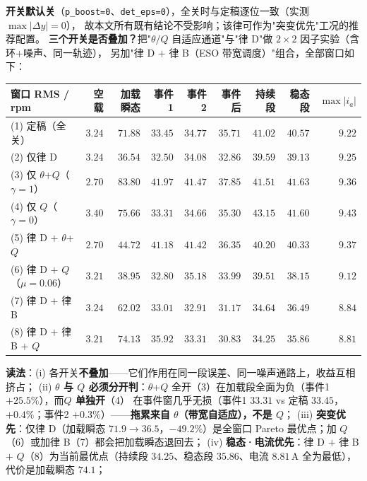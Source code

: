 \documentclass[11pt]{article}
\theoremstyle{remark}\newtheorem{remark}{注}
\begin{document}
\textbf{开关默认关}（\texttt{p\_boost=0}、\texttt{det\_eps=0}），全关时与定稿逐位一致（实测 $\max|\Delta y|=0$），
故本文所有既有结论不受影响；该律可作为"突变优先"工况的推荐配置。
\vspace{1mm}
\noindent\textbf{三个开关是否叠加？}把"$\theta/Q$ 自适应通道"与"律 D"做 $2\times2$ 因子实验（含环$+$噪声、同一轨迹），
另加"律 D $+$ 律 B（ESO 带宽调度）"组合，全部窗口如下：
\begin{center}
\footnotesize
\begin{tabular}{@{}lrrrrrrrr@{}}
\toprule
窗口 RMS / rpm & 空载 & 加载瞬态 & 事件1 & 事件2 & 事件后 & 持续段 & 稳态段 & $\max|i_a|$\\
\midrule
(1) 定稿（全关） & $3.24$ & $71.88$ & $33.45$ & $34.77$ & $35.71$ & $41.02$ & $40.57$ & $9.22$\\
(2) 仅律 D & $3.24$ & $\mathbf{36.54}$ & $32.50$ & $34.08$ & $32.86$ & $39.59$ & $39.13$ & $9.25$\\
(3) 仅 $\theta$+$Q$（$\gamma=1$） & $2.70$ & $83.80$ & $41.97$ & $41.47$ & $37.85$ & $41.51$ & $41.63$ & $9.36$\\
(4) 仅 $Q$（$\gamma=0$） & $3.40$ & $75.66$ & $33.31$ & $34.66$ & $35.30$ & $43.15$ & $41.60$ & $9.43$\\
(5) 律 D $+$ $\theta$+$Q$ & $2.70$ & $44.72$ & $41.18$ & $41.42$ & $36.35$ & $40.20$ & $40.33$ & $9.37$\\
(6) 律 D $+$ $Q$（$\mu{=}0.06$） & $3.21$ & $38.95$ & $32.80$ & $35.18$ & $33.99$ & $39.51$ & $\mathbf{38.15}$ & $9.12$\\
(7) 律 D $+$ 律 B & $3.24$ & $62.02$ & $33.01$ & $32.91$ & $31.17$ & $34.64$ & $36.49$ & $8.84$\\
(8) 律 D $+$ 律 B $+$ $Q$ & $3.21$ & $74.13$ & $35.92$ & $33.31$ & $\mathbf{30.83}$ & $\mathbf{34.25}$ & $\mathbf{35.86}$ & $\mathbf{8.81}$\\
\bottomrule
\end{tabular}
\end{center}
\noindent\textbf{读法}：(i) 各开关\textbf{不叠加}——它们作用在同一段误差、同一噪声通路上，收益互相挤占；
(ii) \textbf{$\theta$ 与 $Q$ 必须分开判}：$\theta$+$Q$ 全开（3）在加载段全面为负（事件1 $+25.5\%$），而\textbf{$Q$ 单独开}（4）
在事件窗几乎无损（事件1 $33.31$ vs 定稿 $33.45$，$+0.4\%$；事件2 $+0.3\%$）——\textbf{拖累来自 $\theta$（带宽自适应），不是 $Q$}；
(iii) \textbf{突变优先}：仅律 D（加载瞬态 $71.9\to36.5$，$-49.2\%$）是全窗口 Pareto 最优点；加 $Q$（6）或加律 B（7）都会把加载瞬态退回去；
(iv) \textbf{稳态·电流优先}：律 D $+$ 律 B $+$ $Q$（8）为当前最优点（持续段 $34.25$、稳态段 $35.86$、电流 $8.81$\,A 全为最低），代价是加载瞬态 $74.1$；
\end{document}
